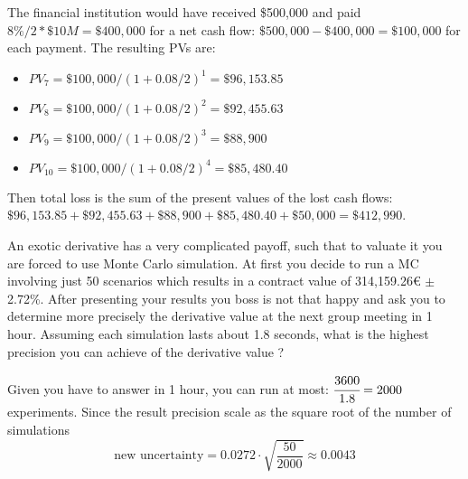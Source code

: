 \documentclass[12pt,a4paper]{exam}
\begin{document}
\begin{questions}
\begin{solution}
\begin{itemize}
The financial institution would have received \$500,000 and paid $8\%/2 * \$10 M = \$400,000$ for a net cash flow: $\$500,000 - \$400,000 = \$100,000$ for each payment. The resulting PVs are:
\begin{itemize}
\item $PV_7 = \$100,000 / (1 + 0.08/2)^1 = \$96,153.85$
\item $PV_8 = \$100,000 / (1 + 0.08/2)^2 = \$92,455.63$
\item $PV_{9} = \$100,000 / (1 + 0.08/2)^3 = \$88,900$
\item $PV_{10} = \$100,000 / (1 + 0.08/2)^4 = \$85,480.40$
\end{itemize}
\end{itemize}

Then total loss is the sum of the present values of the lost cash flows: $\$96,153.85 + \$92,455.63 + \$88,900 + \$85,480.40 + \$50,000 = \$412,990$.
\end{solution}

\question An exotic derivative has a very complicated payoff, such that to valuate it you are forced to use Monte Carlo simulation. 
At first you decide to run a MC involving just 50 scenarios which results in a contract value of 314,159.26€ $\pm$ 2.72\%. After presenting your results you boss is not that happy and ask you to determine more precisely the derivative value at the next group meeting in 1 hour. Assuming each simulation lasts about 1.8 seconds, what is the highest precision you can achieve of the derivative value ?
\makeemptybox{5cm}

\begin{solution}
Given you have to answer in 1 hour, you can run at most: $\cfrac{3600}{1.8}=2000$ experiments. Since the result precision scale as the square root of the number of simulations
\begin{equation*}
\textrm{new uncertainty} = 0.0272 \cdot \sqrt{\frac{50}{2000}} \approx 0.0043
\end{equation*}
\end{solution}

\end{questions}
\end{document}
